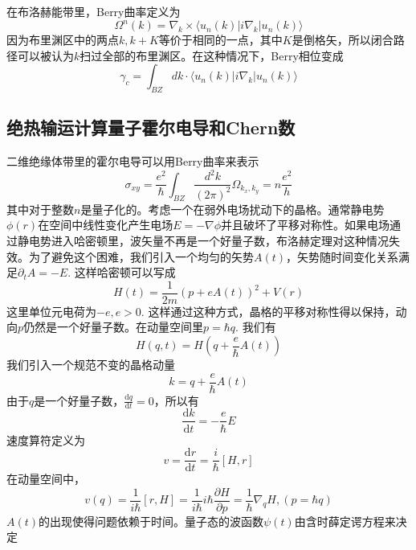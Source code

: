 \documentclass{article}
\numberwithin{equation}{subsection}
\begin{document}
在布洛赫能带里，Berry曲率定义为
\begin{equation}
    \Omega^n(k)=\nabla_k\times\langle u_n(k)|i\nabla_k|u_n(k)\rangle
\end{equation}
因为布里渊区中的两点$k,k+K$等价于相同的一点，其中$K$是倒格矢，所以闭合路径可以被认为$k$扫过全部的布里渊区。在这种情况下，Berry相位变成
\begin{equation}
    \gamma_c=\int_{BZ}dk\cdot\langle u_n(k)|i\nabla_k|u_n(k)\rangle
\end{equation}
\subsection{绝热输运计算量子霍尔电导和Chern数}
二维绝缘体带里的霍尔电导可以用Berry曲率来表示
\begin{equation}
    \sigma_{xy}=\frac{e^2}{\hbar}\int_{BZ}\frac{d^2k}{(2\pi)^2}\Omega_{k_x,k_y}=n\frac{e^2}{h}
\end{equation}
其中对于整数$n$是量子化的。考虑一个在弱外电场扰动下的晶格。通常静电势$\phi(r)$在空间中线性变化产生电场$E=-\nabla\phi$并且破坏了平移对称性。如果电场通过静电势进入哈密顿里，波矢量不再是一个好量子数，布洛赫定理对这种情况失效。为了避免这个困难，我们引入一个均匀的矢势$A(t)$，矢势随时间变化关系满足$\partial_tA=-E$. 这样哈密顿可以写成
\begin{equation}
    H(t)=\frac{1}{2m}(p+eA(t))^2+V(r)
\end{equation}
这里单位元电荷为$-e,e>0$. 这样通过这种方式，晶格的平移对称性得以保持，动向$p$仍然是一个好量子数。在动量空间里$p=\hbar q$. 我们有
\begin{equation}
    H(q,t)=H(q+\frac{e}{\hbar}A(t))
\end{equation}
我们引入一个规范不变的晶格动量
\begin{equation}
    k=q+\frac{e}{\hbar}A(t)
\end{equation}
由于$q$是一个好量子数，$\frac{\mathrm{d}q}{\mathrm{d}t}=0$，所以有
\begin{equation}
    \frac{\mathrm{d}k}{\mathrm{d}t}=-\frac{e}{\hbar}E
\end{equation}
速度算符定义为
\begin{equation}
    v=\frac{\mathrm{d}r}{\mathrm{d}t}=\frac{i}{\hbar}[H,r]
\end{equation}
在动量空间中，
\begin{equation}
    v(q)=\frac{1}{i\hbar}[r,H]=\frac{1}{i\hbar}i\hbar\frac{\partial H}{\partial p}=\frac{1}{\hbar}\nabla_q H,(p=\hbar q)
\end{equation}
$A(t)$的出现使得问题依赖于时间。量子态的波函数$\psi(t)$由含时薛定谔方程来决定
\end{document}

